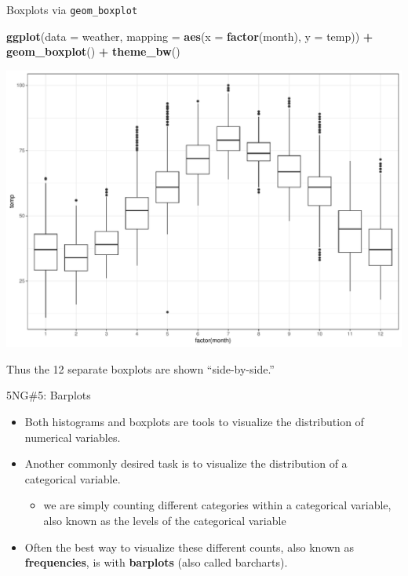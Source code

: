 \documentclass[
  ignorenonframetext,
]{beamer}
\newenvironment{Shaded}{\begin{snugshade}}{\end{snugshade}}
\newcommand{\AttributeTok}[1]{\textcolor[rgb]{0.13,0.29,0.53}{#1}}
\newcommand{\FunctionTok}[1]{\textcolor[rgb]{0.13,0.29,0.53}{\textbf{#1}}}
\newcommand{\NormalTok}[1]{#1}
\newcommand{\SpecialCharTok}[1]{\textcolor[rgb]{0.81,0.36,0.00}{\textbf{#1}}}
\providecommand{\tightlist}{%
  \setlength{\itemsep}{0pt}\setlength{\parskip}{0pt}}
\begin{document}
\begin{frame}[fragile]{Boxplots via \texttt{geom\_boxplot}}
\protect\hypertarget{boxplots-via-geom_boxplot}{}
\tiny

\begin{Shaded}
\begin{Highlighting}[]
\FunctionTok{ggplot}\NormalTok{(}\AttributeTok{data =}\NormalTok{ weather, }\AttributeTok{mapping =} \FunctionTok{aes}\NormalTok{(}\AttributeTok{x =} \FunctionTok{factor}\NormalTok{(month), }\AttributeTok{y =}\NormalTok{ temp)) }\SpecialCharTok{+}
  \FunctionTok{geom\_boxplot}\NormalTok{() }\SpecialCharTok{+} 
  \FunctionTok{theme\_bw}\NormalTok{()}
\end{Highlighting}
\end{Shaded}

\begin{center}\includegraphics[width=0.9\linewidth,height=0.5\textheight]{Week2_Lect_files/figure-beamer/unnamed-chunk-34-1} \end{center}
\normalsize

Thus the 12 separate boxplots are shown ``side-by-side.''
\end{frame}

\begin{frame}{5NG\#5: Barplots}
\protect\hypertarget{ng5-barplots}{}
\begin{itemize}
\item
  Both histograms and boxplots are tools to visualize the distribution
  of numerical variables.
\item
  Another commonly desired task is to visualize the distribution of a
  categorical variable.

  \begin{itemize}
  \tightlist
  \item
    we are simply counting different categories within a categorical
    variable, also known as the levels of the categorical variable
  \end{itemize}
\item
  Often the best way to visualize these different counts, also known as
  \textbf{frequencies}, is with \textbf{barplots} (also called
  barcharts).
\end{itemize}
\end{frame}
\end{document}
